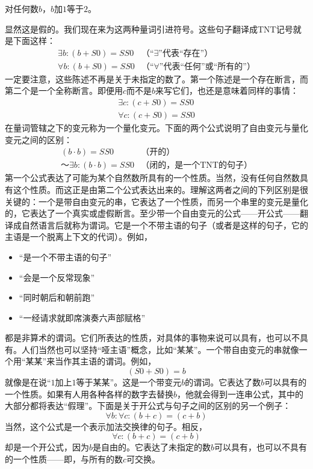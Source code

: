 \begin{block}
对任何数$b$，$b$加$1$等于$2$。
\end{block}
显然这是假的。我们现在来为这两种量词引进符号。这些句子翻译成TNT记号就是下面这样：
\[
\begin{array}{ll}
\exists b: (b+S0)=SS0 & \text{（“$\exists$”代表“存在”）} \\
\forall b: (b+S0)=SS0 & \text{（“$\forall$”代表“任何”或“所有的”）}
\end{array}
\]
一定要注意，这些陈述不再是关于未指定的数了。第一个陈述是一个存在断言，而第二个是一个全称断言。即便用$c$而不是$b$来写它们，也还是意味着同样的事情：
\[
\begin{gathered}
\exists c: (c+S0)=SS0\\
\forall c: (c+S0)=SS0
\end{gathered}
\]
在量词管辖之下的变元称为一个量化变元。下面的两个公式说明了自由变元与量化变元之间的区别：
\[
\begin{array}{rl}
(b\cdot b)=SS0 & \text{（开的）}\\
～\exists b: (b\cdot b)=SS0 & \text{（闭的，是一个TNT的句子）}
\end{array}
\]
第一个公式表达了可能为某个自然数所具有的一个性质。当然，没有任何自然数具有这个性质。而这正是由第二个公式表达出来的。理解这两者之间的下列区别是很关键的：一个是带自由变元的串，它表达了一个性质，而另一个串里的变元是量化的，它表达了一个真实或虚假断言。至少带一个自由变元的公式——开公式——翻译成自然语言后就称为谓词。它是一个不带主语的句子（或者是这样的句子，它的主语是一个脱离上下文的代词）。例如，
\begin{itemize}
\item “是一个不带主语的句子”
\item “会是一个反常现象”
\item “同时朝后和朝前跑”
\item “一经请求就即席演奏六声部赋格”
\end{itemize}
都是非算术的谓词。它们所表达的性质，对具体的事物来说可以具有，也可以不具有。人们当然也可以坚持“哑主语”概念，比如“某某”。一个带自由变元的串就像一个用“某某”来当作其主语的谓词。例如，
\[
(S0+S0)=b
\]
就像是在说“$1$加上$1$等于某某”。这是一个带变元$b$的谓词。它表达了数$b$可以具有的一个性质。如果有人用各种各样的数字去替换$b$，他就会得到一连串公式，其中的大部分都将表达“假理”。下面是关于开公式与句子之间的区别的另一个例子：
\[
\forall b:\forall c:(b+c)=(c+b)
\]
当然，这个公式是一个表示加法交换律的句子。相反，
\[
\forall c:(b+c)=(c+b)
\]
却是一个开公式，因为$b$是自由的。它表达了未指定的数$b$可以具有，也可以不具有的一个性质——即，与所有的数$c$可交换。


